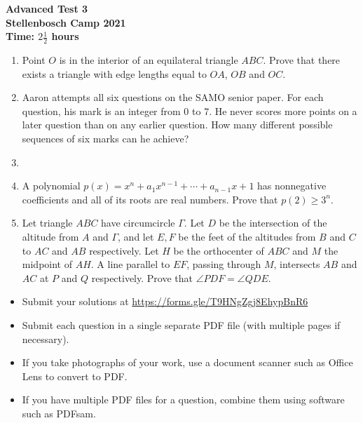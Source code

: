 \documentclass{article}
\begin{document}
\thispagestyle{empty}

\begin{center}
  \textbf{\Large Advanced Test 3}
  \\ \vspace{1em}
  \textbf{\large Stellenbosch Camp 2021}
  \\ \vspace{1em}
  \textbf{\large Time: $2\frac{1}{2}$ hours}
\end{center}

\bigskip

\begin{enumerate}[itemsep=\fill]

\item %
Point $O$ is in the interior of an equilateral triangle $ABC$. Prove that there exists a triangle with edge lengths equal to $OA$, $OB$ and $OC$.

\item %
Aaron attempts all six questions on the SAMO senior paper. For each question, his mark is an integer from 0 to 7. He never scores more points on a later question than on any earlier question. How many different possible sequences of six marks can he achieve? 


\item %


\item %
A polynomial $p(x) = x^n +a_1 x^{n-1} +\dotsb +a_{n-1} x +1$ has nonnegative coefficients and all of its roots are real numbers.
Prove that $p(2) \geq 3^n$.


\item %
Let triangle $ABC$ have circumcircle $\Gamma$. Let $D$ be the intersection of the altitude from $A$ and $\Gamma$, and let $E,F$ be the feet of the altitudes from $B$ and $C$ to $AC$ and $AB$ respectively. Let $H$ be the orthocenter of $ABC$ and $M$ the midpoint of $AH$. A line parallel to $EF$, passing through $M$, intersects $AB$ and $AC$ at $P$ and $Q$ respectively. Prove that $\angle PDF = \angle QDE$.

\end{enumerate}


\vfill
\begin{itemize}
	\item Submit your solutions at \href{https://forms.gle/T9HNgZgj8EhypBnR6}{https://forms.gle/T9HNgZgj8EhypBnR6}
	\item Submit each question in a single separate PDF file (with multiple pages if necessary).
	\item If you take photographs of your work, use a document scanner such as Office Lens to convert to PDF.
	\item If you have multiple PDF files for a question, combine them using software such as PDFsam.
\end{itemize}
\end{document}
